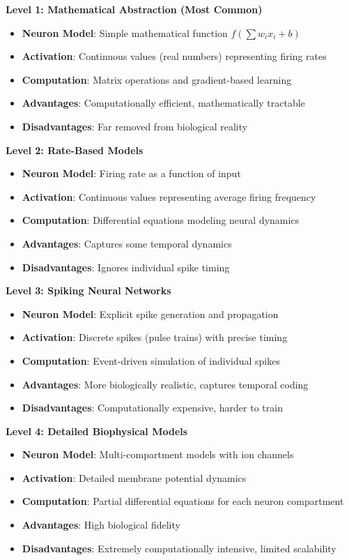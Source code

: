 \textbf{Level 1: Mathematical Abstraction (Most Common)}

\begin{itemize}
\item \textbf{Neuron Model}: Simple mathematical function $f\left(\sum w_i x_i + b\right)$
\item \textbf{Activation}: Continuous values (real numbers) representing firing rates
\item \textbf{Computation}: Matrix operations and gradient-based learning
\item \textbf{Advantages}: Computationally efficient, mathematically tractable
\item \textbf{Disadvantages}: Far removed from biological reality
\end{itemize}

\textbf{Level 2: Rate-Based Models}

\begin{itemize}
\item \textbf{Neuron Model}: Firing rate as a function of input
\item \textbf{Activation}: Continuous values representing average firing frequency
\item \textbf{Computation}: Differential equations modeling neural dynamics
\item \textbf{Advantages}: Captures some temporal dynamics
\item \textbf{Disadvantages}: Ignores individual spike timing
\end{itemize}

\textbf{Level 3: Spiking Neural Networks}

\begin{itemize}
\item \textbf{Neuron Model}: Explicit spike generation and propagation
\item \textbf{Activation}: Discrete spikes (pulse trains) with precise timing
\item \textbf{Computation}: Event-driven simulation of individual spikes
\item \textbf{Advantages}: More biologically realistic, captures temporal coding
\item \textbf{Disadvantages}: Computationally expensive, harder to train
\end{itemize}

\textbf{Level 4: Detailed Biophysical Models}

\begin{itemize}
\item \textbf{Neuron Model}: Multi-compartment models with ion channels
\item \textbf{Activation}: Detailed membrane potential dynamics
\item \textbf{Computation}: Partial differential equations for each neuron compartment
\item \textbf{Advantages}: High biological fidelity
\item \textbf{Disadvantages}: Extremely computationally intensive, limited scalability
\end{itemize}

